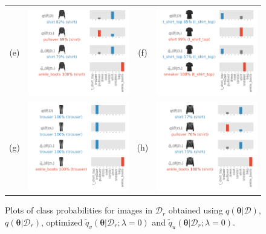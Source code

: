 \documentclass{article}
\theoremstyle{definition}
\newcommand{\mcl}[1]{\mathcal{#1}}
\newcommand{\da}{\mcl{D}}
\newcommand{\dc}{\mcl{D}_r}
\newcommand{\eubo}{\tilde{q}_u}
\newcommand{\elbo}{\tilde{q}_v}
\begin{document}
\begin{figure}
\begin{tabular}{@{}c@{}cc@{}c@{}}
\\
(e)
&
\includegraphics[height=0.4\textwidth]{img/fashionmnist/fashionmnist_1521.pdf}
&
(f)
&
\includegraphics[height=0.4\textwidth]{img/fashionmnist/fashionmnist_780.pdf}%
\\
(g)
&
\includegraphics[height=0.4\textwidth]{img/fashionmnist/fashionmnist_2237.pdf} %
&
(h)
&
\includegraphics[height=0.4\textwidth]{img/fashionmnist/fashionmnist_982.pdf}
\end{tabular}
\caption{Plots of class probabilities for images in $\dc$ obtained using $q(\bm{\theta}|\da)$, $q(\bm{\theta}|\dc)$, optimized $\elbo(\bm{\theta}|\dc;\lambda=0)$ and $\eubo(\bm{\theta}|\dc;\lambda=0)$.}
\label{fig:mnistmore}
\end{figure}
\end{document}
